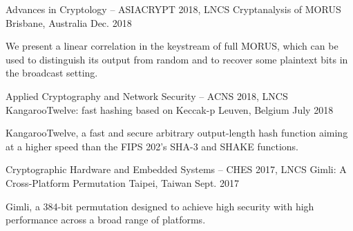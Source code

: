 \begin{cventries}
	\vspace{1em}
	\cventry
	{Advances in Cryptology – ASIACRYPT 2018, LNCS}
	{Cryptanalysis of MORUS} %
	{Brisbane, Australia} %
	{Dec. 2018} %
	{
		\begin{cvitems} %
			\item {We present a linear correlation in the keystream of full MORUS, which can be used to distinguish its output from random and to recover some plaintext bits in the broadcast setting.}
		\end{cvitems}
	}

	\cventry
	{Applied Cryptography and Network Security – ACNS 2018, LNCS}
	{KangarooTwelve: fast hashing based on Keccak-p} %
	{Leuven, Belgium} %
	{July 2018} %
	{
		\begin{cvitems} %
			\item {KangarooTwelve, a fast and secure arbitrary output-length hash function aiming at a higher speed than the FIPS 202’s SHA-3 and SHAKE functions.}
		\end{cvitems}
	}

	\cventry
	{Cryptographic Hardware and Embedded Systems – CHES 2017, LNCS}
	{Gimli: A Cross-Platform Permutation} %
	{Taipei, Taiwan} %
	{Sept. 2017} %
	{
		\begin{cvitems} %
			\item {Gimli, a 384-bit permutation designed to achieve high security with high performance across a broad range of platforms.}
		\end{cvitems}
	}


\end{cventries}
